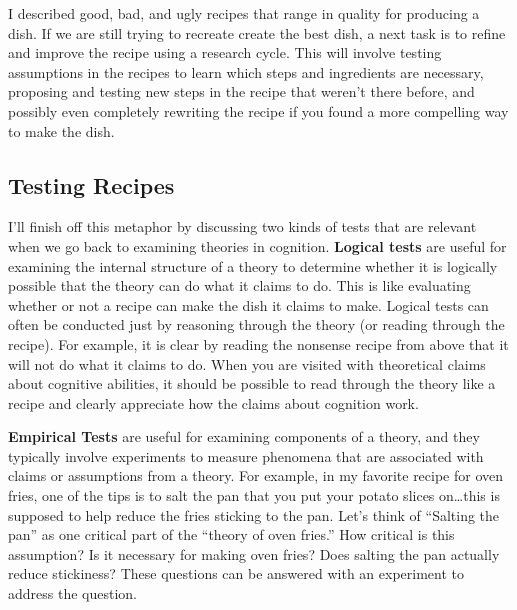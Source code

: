 \documentclass[
  oneside,
  12pt]{crumpbook}
\begin{document}
I described good, bad, and ugly recipes that range in quality for producing a dish. If we are still trying to recreate create the best dish, a next task is to refine and improve the recipe using a research cycle. This will involve testing assumptions in the recipes to learn which steps and ingredients are necessary, proposing and testing new steps in the recipe that weren't there before, and possibly even completely rewriting the recipe if you found a more compelling way to make the dish.

\hypertarget{testing-recipes}{%
\subsection{Testing Recipes}\label{testing-recipes}}

I'll finish off this metaphor by discussing two kinds of tests that are relevant when we go back to examining theories in cognition. \textbf{Logical tests} are useful for examining the internal structure of a theory to determine whether it is logically possible that the theory can do what it claims to do. This is like evaluating whether or not a recipe can make the dish it claims to make. Logical tests can often be conducted just by reasoning through the theory (or reading through the recipe). For example, it is clear by reading the nonsense recipe from above that it will not do what it claims to do. When you are visited with theoretical claims about cognitive abilities, it should be possible to read through the theory like a recipe and clearly appreciate how the claims about cognition work.

\textbf{Empirical Tests} are useful for examining components of a theory, and they typically involve experiments to measure phenomena that are associated with claims or assumptions from a theory. For example, in my favorite recipe for oven fries, one of the tips is to salt the pan that you put your potato slices on\ldots this is supposed to help reduce the fries sticking to the pan. Let's think of ``Salting the pan'' as one critical part of the ``theory of oven fries.'' How critical is this assumption? Is it necessary for making oven fries? Does salting the pan actually reduce stickiness? These questions can be answered with an experiment to address the question.
\end{document}
